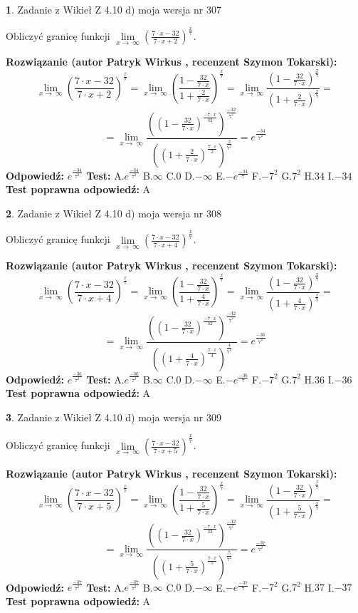 \documentclass[12pt, a4paper]{article}
\theoremstyle{definition} %
\newtheorem{zad}{}
\newcommand{\zadStart}[1]{\begin{zad}#1\newline}
\newcommand{\zadStop}{\end{zad}}
\newcommand{\rozwStart}[2]{\noindent \textbf{Rozwiązanie (autor #1 , recenzent #2): }\newline}
\newcommand{\rozwStop}{\newline}
\newcommand{\odpStart}{\noindent \textbf{Odpowiedź:}\newline}
\newcommand{\odpStop}{\newline}
\newcommand{\testStart}{\noindent \textbf{Test:}\newline}
\newcommand{\testStop}{\newline}
\newcommand{\kluczStart}{\noindent \textbf{Test poprawna odpowiedź:}\newline}
\newcommand{\kluczStop}{\newline}
\begin{document}
\zadStart{Zadanie z Wikieł Z 4.10 d) moja wersja nr 307}


Obliczyć granicę funkcji  $\lim\limits_{x\to\ \infty}(\frac{7\cdot x-32}{7\cdot x+2})^{\frac{x}{7}}$.
\zadStop
\rozwStart{Patryk Wirkus}{Szymon Tokarski}
$$\lim\limits_{x\to\ \infty}(\frac{7\cdot x-32}{7\cdot x+2})^{\frac{x}{7}} = \lim\limits_{x\to\ \infty}(\frac{1-\frac{32}{7\cdot x}}{1+\frac{2}{7\cdot x}})^{\frac{x}{7}}=\lim\limits_{x\to\ \infty}\frac{(1-\frac{32}{7\cdot x})^{\frac{x}{7}}}{(1+\frac{2}{7\cdot x})^{\frac{x}{7}}}=$$
$$=\lim\limits_{x\to\ \infty}\frac{((1-\frac{32}{7\cdot x})^{\frac{-7\cdot x}{32}})^{\frac{-32}{7^{2}}}}{((1+\frac{2}{7\cdot x})^{\frac{7\cdot x}{2}})^{\frac{2}{7^{2}}}}=e^{\frac{-34}{7^{2}}}$$
\rozwStop
\odpStart
$e^{\frac{-34}{7^{2}}}$
\odpStop
\testStart
A.$e^{\frac{-34}{7^{2}}}$ B.$\infty$ C.$0$ D.$-\infty$ E.$-e^{\frac{-34}{7}}$
F.$-7^{2}$ G.$7^{2}$
H.$34$
I.$-34$
\testStop
\kluczStart
A
\kluczStop



\zadStart{Zadanie z Wikieł Z 4.10 d) moja wersja nr 308}


Obliczyć granicę funkcji  $\lim\limits_{x\to\ \infty}(\frac{7\cdot x-32}{7\cdot x+4})^{\frac{x}{7}}$.
\zadStop
\rozwStart{Patryk Wirkus}{Szymon Tokarski}
$$\lim\limits_{x\to\ \infty}(\frac{7\cdot x-32}{7\cdot x+4})^{\frac{x}{7}} = \lim\limits_{x\to\ \infty}(\frac{1-\frac{32}{7\cdot x}}{1+\frac{4}{7\cdot x}})^{\frac{x}{7}}=\lim\limits_{x\to\ \infty}\frac{(1-\frac{32}{7\cdot x})^{\frac{x}{7}}}{(1+\frac{4}{7\cdot x})^{\frac{x}{7}}}=$$
$$=\lim\limits_{x\to\ \infty}\frac{((1-\frac{32}{7\cdot x})^{\frac{-7\cdot x}{32}})^{\frac{-32}{7^{2}}}}{((1+\frac{4}{7\cdot x})^{\frac{7\cdot x}{4}})^{\frac{4}{7^{2}}}}=e^{\frac{-36}{7^{2}}}$$
\rozwStop
\odpStart
$e^{\frac{-36}{7^{2}}}$
\odpStop
\testStart
A.$e^{\frac{-36}{7^{2}}}$ B.$\infty$ C.$0$ D.$-\infty$ E.$-e^{\frac{-36}{7}}$
F.$-7^{2}$ G.$7^{2}$
H.$36$
I.$-36$
\testStop
\kluczStart
A
\kluczStop



\zadStart{Zadanie z Wikieł Z 4.10 d) moja wersja nr 309}


Obliczyć granicę funkcji  $\lim\limits_{x\to\ \infty}(\frac{7\cdot x-32}{7\cdot x+5})^{\frac{x}{7}}$.
\zadStop
\rozwStart{Patryk Wirkus}{Szymon Tokarski}
$$\lim\limits_{x\to\ \infty}(\frac{7\cdot x-32}{7\cdot x+5})^{\frac{x}{7}} = \lim\limits_{x\to\ \infty}(\frac{1-\frac{32}{7\cdot x}}{1+\frac{5}{7\cdot x}})^{\frac{x}{7}}=\lim\limits_{x\to\ \infty}\frac{(1-\frac{32}{7\cdot x})^{\frac{x}{7}}}{(1+\frac{5}{7\cdot x})^{\frac{x}{7}}}=$$
$$=\lim\limits_{x\to\ \infty}\frac{((1-\frac{32}{7\cdot x})^{\frac{-7\cdot x}{32}})^{\frac{-32}{7^{2}}}}{((1+\frac{5}{7\cdot x})^{\frac{7\cdot x}{5}})^{\frac{5}{7^{2}}}}=e^{\frac{-37}{7^{2}}}$$
\rozwStop
\odpStart
$e^{\frac{-37}{7^{2}}}$
\odpStop
\testStart
A.$e^{\frac{-37}{7^{2}}}$ B.$\infty$ C.$0$ D.$-\infty$ E.$-e^{\frac{-37}{7}}$
F.$-7^{2}$ G.$7^{2}$
H.$37$
I.$-37$
\testStop
\kluczStart
A
\kluczStop
\end{document}

